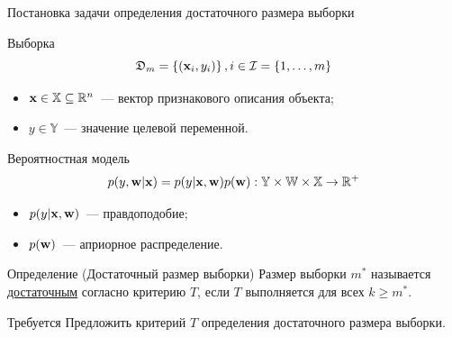 \documentclass{beamer}
\begin{document}
\begin{frame}{Постановка задачи определения достаточного размера выборки}
    \vspace{-0.3cm}
    \begin{block}{Выборка}
        \vspace{-0.5cm}
        \[ \mathfrak{D}_m = \left\{ (\mathbf{x}_i, y_i) \right\}, i \in \mathcal{I} = \{ 1, \ldots, m \} \]
        \vspace{-0.6cm}
        \begin{itemize}
            \item $\mathbf{x} \in \mathbb{X} \subseteq \mathbb{R}^n$~--- вектор признакового описания объекта;
            \item $y \in \mathbb{Y}$~--- значение целевой переменной.
        \end{itemize}
    \end{block}
    \vspace{-0.3cm}
    \begin{block}{Вероятностная модель}
        \vspace{-0.4cm}
        \[ p(y, \mathbf{w} | \mathbf{x}) = p(y | \mathbf{x}, \mathbf{w}) p(\mathbf{w}): \mathbb{Y} \times \mathbb{W} \times \mathbb{X} \to \mathbb{R}^+ \]
        \vspace{-0.6cm}
        \begin{itemize}
            \item $p(y | \mathbf{x}, \mathbf{w})$~--- правдоподобие;
            \item $p(\mathbf{w})$~--- априорное распределение.
        \end{itemize}
    \end{block}
    \vspace{-0.3cm}
    \begin{block}{Определение (Достаточный размер выборки)}
        Размер выборки $m^*$ называется \underline{достаточным} согласно критерию $T$, если $T$ выполняется для всех $k \geqslant m^*$.
    \end{block}
    \begin{block}{Требуется}
        Предложить критерий $T$ определения достаточного размера выборки.
    \end{block}
\end{frame}
\end{document}
